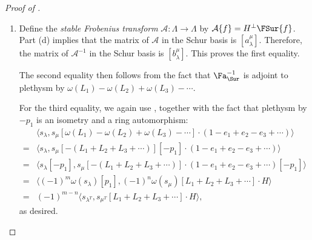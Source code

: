 \begin{proof}[Proof of ]
\begin{enumerate}[label=(\alph*)]
\[        \]
        which is just $\langle f, s_\mu \cdot H \rangle$. Hence, \eqref{equation:limit} indeed holds. Substituting \eqref{equation:limit} into \eqref{equation:amulambda} with $f = \FSur{s_\lambda}$, we obtain \[a^\mu_\lambda = \langle \FSur{s_\lambda}, s_\mu \cdot H \rangle.\] The result now follows from the fact that $\Fa_{\Sur}$ is adjoint to plethysm by $H_+$.
        \item Define the \emph{stable Frobenius transform} $\mathcal{A} \colon \Lambda \to \Lambda$ by $\mathcal{A} \{f\} = H^\perp \FSur{f}$. Part (d) implies that the matrix of $\mathcal{A}$ in the Schur basis is $[a_\lambda^\mu]$. Therefore, the matrix of $\mathcal{A}^{-1}$ in the Schur basis is $[b_\lambda^\mu]$. This proves the first equality.
        
        The second equality then follows from the fact that $\Fa_{\Sur}^{-1}$ is adjoint to plethysm by $\omega(L_1) - \omega(L_2) + \omega(L_3) - \cdots$.
        
        For the third equality, we again use , together with the fact that plethysm by $-p_1$ is an isometry and a ring automorphism:
        \begin{align*}
            &\langle s_\lambda, s_\mu[\omega(L_1) - \omega(L_2) + \omega(L_3) - \cdots] \cdot (1 - e_1 + e_2 - e_3 + \cdots)\rangle \\
            =& \langle s_\lambda, s_\mu[-(L_1 + L_2 + L_3 + \cdots)][-p_1] \cdot (1 - e_1 + e_2 - e_3 + \cdots)\rangle \\
            =& \langle s_\lambda[-p_1], s_\mu[-(L_1 + L_2 + L_3 + \cdots)] \cdot (1 - e_1 + e_2 - e_3 + \cdots)[-p_1]\rangle \\
            =& \langle (-1)^m \omega(s_\lambda)[p_1], (-1)^n \omega(s_\mu)[L_1 + L_2 + L_3 + \cdots] \cdot H\rangle \\
            =& (-1)^{m - n} \langle s_{\lambda^T}, s_{\mu^T}[L_1 + L_2 + L_3 + \cdots] \cdot H\rangle,
        \end{align*}
        as desired. \qedhere
    \end{enumerate}
\end{proof}

